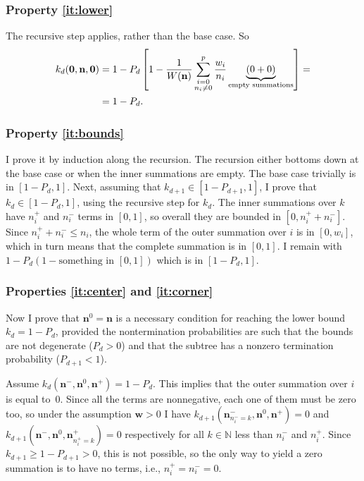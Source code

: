 \documentclass[a4paper]{article}
\newcommand{\nvecs}{\mathbf n^-, \mathbf n^0, \mathbf n^+}
\theoremstyle{definition}
\begin{document}
    \subsubsection{Property \ref{it:lower}}

    The recursive step applies, rather than the base case. So
    \begin{align}
        k_d(\mathbf 0, \mathbf n, \mathbf 0) &=
        1 - P_d\left[
            1 - \frac 1 {W(\mathbf n)} \sum_{\substack{i=0 \\ n_i\ne0}}^p
                \frac{w_i}{n_i}
                \underbrace{(0 + 0)}_\text{empty summations}
        \right] = \notag \\
        &= 1 - P_d.
    \end{align}
    
    \subsubsection{Property \ref{it:bounds}}
    \label{sec:bounds}
    
    I prove it by induction along the recursion. The recursion either bottoms down at the base case or when the inner summations are empty. The base case trivially is in $[1 - P_d, 1]$. Next, assuming that $k_{d+1} \in [1 - P_{d+1}, 1]$, I prove that $k_d \in [1 - P_d, 1]$, using the recursive step for $k_d$. The inner summations over $k$ have $n^+_i$ and $n^-_i$ terms in $[0, 1]$, so overall they are bounded in $[0, n^+_i + n^-_i]$. Since $n^+_i + n^-_i \le n_i$, the whole term of the outer summation over $i$ is in $[0, w_i]$, which in turn means that the complete summation is in $[0, 1]$. I remain with $1 - P_d(1 - \text{something in $[0, 1]$})$ which is in $[1 - P_d, 1]$.
    
    \subsubsection{Properties \ref{it:center} and \ref{it:corner}}
    
    Now I prove that $\mathbf n^0 = \mathbf n$ is a necessary condition for reaching the lower bound $k_d = 1 - P_d$, provided the nontermination probabilities are such that the bounds are not degenerate ($P_d > 0$) and that the subtree has a nonzero termination probability ($P_{d+1} < 1$).
    
    Assume $k_d(\nvecs) = 1 - P_d$. This implies that the outer summation over
    $i$ is equal to~0. Since all the terms are nonnegative, each one of them
    must be zero too, so under the assumption $\mathbf w > 0$ I have
    $k_{d+1}(\mathbf n^-_{n^-_i=k}, \mathbf n^0, \mathbf n^+) = 0$ and
    $k_{d+1}(\mathbf n^-, \mathbf n^0, \mathbf n^+_{n^+_i=k}) = 0$ respectively
    for all $k \in \mathbb N$ less than $n^-_i$ and $n^+_i$. Since $k_{d+1} \ge
    1 - P_{d+1} > 0$, this is not possible, so the only way to yield a zero
    summation is to have no terms, i.e., $n^+_i = n^-_i = 0$.
    
\end{document}
